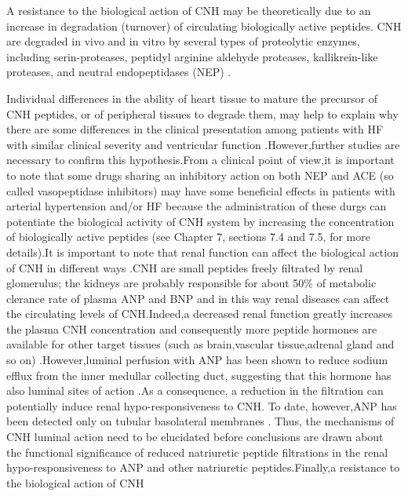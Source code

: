 \documentclass[14pt,a4paper,onecolumn]{extarticle}
\begin{document}
A resistance to the biological action of CNH may be theoretically due to an increase
in degradation (turnover) of circulating biologically active peptides. CNH are degraded in vivo and in vitro by several types of proteolytic enzymes, including serin-proteases, peptidyl arginine aldehyde proteases, kallikrein-like proteases, and neutral
endopeptidases (NEP) \citep{bib35} \citep{bib36} \citep{bib318} \citep{bib334} \citep{bib335} \citep{bib336} \citep{bib337} \citep{bib338}.

Individual differences in the ability of heart tissue to mature the precursor of CNH peptides, or of peripheral tissues to degrade them, may help to explain why there are some differences in the clinical presentation among patients with HF with similar clinical severity
and ventricular function \citep{bib36}.However,further studies are necessary to confirm this hypothesis.From a clinical point of view,it is important to note that some drugs sharing an inhibitory action on both NEP and ACE (so called vasopeptidase inhibitors) may have some beneficial effects in patients with arterial hypertension and/or HF because the administration of
these durgs can potentiate the biological activity of CNH system by increasing the concentration of biologically active peptides \citep{bib339} \citep{bib340} \citep{bib341} \citep{bib342} (see Chapter 7, sections 7.4 and 7.5, for more
details).It is important to note that renal function can affect the biological action of CNH in
different ways \citep{bib35} .CNH are small peptides freely filtrated
by renal glomerulus; the kidneys are probably responsible for about 50\% of metabolic clerance rate of plasma ANP and BNP and in this way renal diseases can affect the circulating levels of CNH.Indeed,a decreased renal function greatly increases the plasma CNH concentration
and consequently more peptide hormones are available for other target tissues (such as
brain,vascular tissue,adrenal gland and so on) \citep{bib35}.However,luminal perfusion with ANP has
been shown to reduce sodium efflux from the inner medullar collecting duct, suggesting
that this hormone has also luminal sites of action \citep{bib325}.As a consequence, a reduction in the
filtration can potentially induce renal hypo-responsiveness to CNH. To date, however,ANP
has been detected only on tubular basolateral membranes \citep{bib325}. Thus, the mechanisms of
CNH luminal action need to be elucidated before conclusions are drawn about the functional significance of reduced natriuretic peptide filtrations in the renal hypo-responsiveness to ANP and other natriuretic peptides.Finally,a resistance to the biological action of CNH
\end{document}
